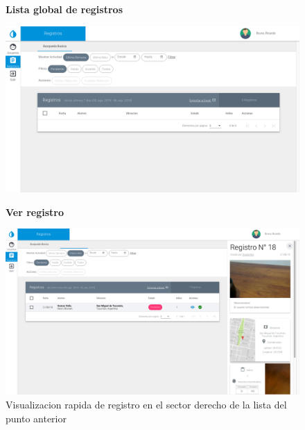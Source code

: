 				\begin{figure}[H]
					\hspace*{1cm}\raggedright\large\textbf{Lista global de registros}\par\medskip
					\centering
						\includegraphics[width=1\textwidth]{Screenshots/web/registroListar.png}
				\end{figure}

			
				\begin{figure}[H]
					\hspace*{1cm}\raggedright\large\textbf{Ver registro}\par\medskip
					\centering
						\includegraphics[width=1\textwidth]{Screenshots/web/registroVer1.png}
							\caption{Visualizacion rapida de registro en el sector derecho de la lista del punto anterior}
				\end{figure}
			
